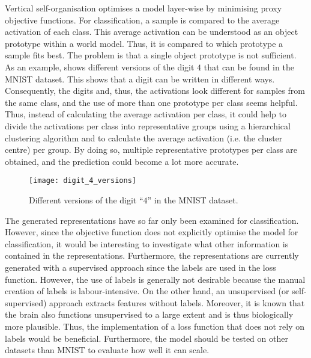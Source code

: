 Vertical self-organisation optimises a model layer-wise by minimising proxy objective functions.
For classification, a sample is compared to the average activation of each class. This average activation can be understood as an object prototype within a world model. Thus, it is compared to which prototype a sample fits best. The problem is that a single object prototype is not sufficient. As an example,  shows different versions of the digit $4$ that can be found in the MNIST dataset. This shows that a digit can be written in different ways.
Consequently, the digits and, thus, the activations look different for samples from the same class, and the use of more than one prototype per class seems helpful. Thus, instead of calculating the average activation per class, it could help to divide the activations per class into representative groups using a hierarchical clustering algorithm and to calculate the average activation (i.e. the cluster centre) per group. By doing so, multiple representative prototypes per class are obtained, and the prediction could become a lot more accurate.

\begin{figure}[h]
    \centering
    \texttt{[image: digit\_4\_versions]}
    \caption[Different versions of the digit ``$4$'' in the MNIST dataset]{Different versions of the digit ``$4$'' in the MNIST dataset.}
\end{figure}


The generated representations have so far only been examined for classification. However, since the objective function does not explicitly optimise the model for classification, it would be interesting to investigate what other information is contained in the representations. Furthermore, the representations are currently generated with a supervised approach since the labels are used in the loss function. However, the use of labels is generally not desirable because the manual creation of labels is labour-intensive. On the other hand, an unsupervised (or self-supervised) approach extracts features without labels. Moreover, it is known that the brain also functions unsupervised to a large extent and is thus biologically more plausible.
Thus, the implementation of a loss function that does not rely on labels would be beneficial. Furthermore, the model should be tested on other datasets than MNIST to evaluate how well it can scale.


